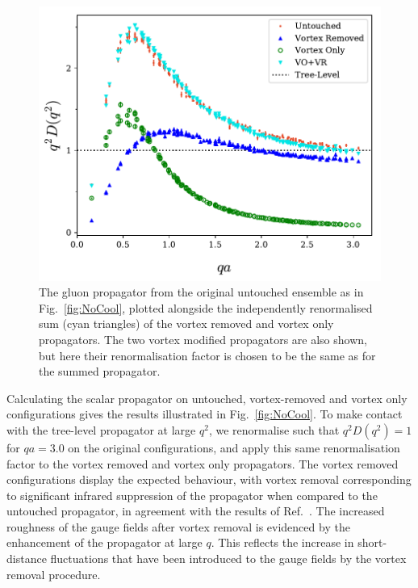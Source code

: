 \begin{figure}[tb]
\centering
\includegraphics[width=\linewidth]{./ScalarGluComp_q2_NoCoolSum2.pdf}
\caption[The gluon propagator from the original untouched alongside the independently renormalised sum of the vortex removed and vortex only propagators.]{\label{fig:NoCoolSum}The gluon propagator from the original untouched ensemble as in Fig.~\ref{fig:NoCool}, plotted alongside the independently renormalised sum (cyan triangles) of the vortex removed and vortex only propagators. The two vortex modified propagators are also shown, but here their renormalisation factor is chosen to be the same as for the summed propagator.}
\end{figure}
%
Calculating the scalar propagator on untouched, vortex-removed and vortex only configurations gives the results illustrated in Fig.~\ref{fig:NoCool}. To make contact with the tree-level propagator at large $q^2$, we renormalise such that $q^2D(q^2)=1$ for $qa = 3.0$ on the original configurations, and apply this same renormalisation factor to the vortex removed and vortex only propagators. The vortex removed configurations display the expected behaviour, with vortex removal corresponding to significant infrared suppression of the propagator when compared to the untouched propagator, in agreement with the results of Ref.~\cite{Bowman:2010zr}. The increased roughness of the gauge fields after vortex removal is evidenced by the enhancement of the propagator at large $q$. This reflects the increase in short-distance fluctuations that have been introduced to the gauge fields by the vortex removal procedure.\\

